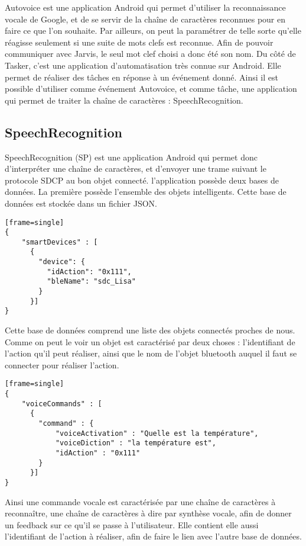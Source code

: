 Autovoice est une application Android qui permet d'utiliser la reconnaissance vocale de Google, et de se 
servir de la chaîne de caractères reconnues pour en faire ce que l'on souhaite. Par ailleurs, on peut la 
paramétrer de telle sorte qu'elle réagisse seulement si une suite de mots clefs est reconnue. Afin de pouvoir 
communiquer avec Jarvis, le seul mot clef choisi a donc été son nom. Du côté de Tasker, c'est une application 
d'automatisation très connue sur Android. Elle permet de réaliser des tâches en réponse à un événement donné. 
Ainsi il est possible d'utiliser comme événement Autovoice, et comme tâche, une application qui permet de 
traiter la chaîne de caractères : SpeechRecognition.

	\subsection{SpeechRecognition}
	
SpeechRecognition (SP) est une application Android qui permet donc d'interpréter une chaîne de caractères, et 
d'envoyer une trame suivant le protocole SDCP au bon objet connecté. l'application possède deux bases de 
données. La première possède l'ensemble des objets intelligents. Cette base de données est stockée dans un 
fichier JSON.

\begin{lstlisting}[caption=Base de données des objets intelligents][frame=single]
{
    "smartDevices" : [
      {
        "device": {
          "idAction": "0x111",
          "bleName": "sdc_Lisa"
        }
      }]
}
\end{lstlisting}

Cette base de données comprend une liste des objets connectés proches de nous. Comme on peut le voir un objet 
est caractérisé par deux choses : l'identifiant de l'action qu'il peut réaliser, ainsi que le nom de l'objet 
bluetooth auquel il faut se connecter pour réaliser l'action.

\begin{lstlisting}[caption=Base de données des commandes vocales][frame=single]
{
    "voiceCommands" : [
      {
        "command" : {
            "voiceActivation" : "Quelle est la température",
            "voiceDiction" : "la température est",
            "idAction" : "0x111"
        }
      }]
}
\end{lstlisting}

Ainsi une commande vocale est caractérisée par une chaîne de caractères à reconnaître, une chaîne de 
caractères à dire par synthèse vocale, afin de donner un feedback sur ce qu'il se passe à l'utilisateur. Elle 
contient elle aussi l'identifiant de l'action à réaliser, afin de faire le lien avec l'autre base de données.


